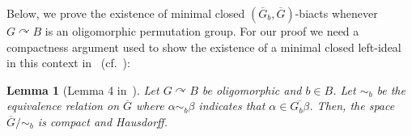 \documentclass{article}
\newtheorem{lemma}[theorem]{Lemma}
\theoremstyle{remark}
\theoremstyle{definition}
\def\acts{\curvearrowright}
\begin{document}
Below, we prove the existence of minimal closed $(\overline{G}_b, \overline{G})$-biacts whenever $G\acts B$ is an oligomorphic permutation group. For our proof we need a {compactness argument} %
 {used} to show the existence of a minimal closed left-ideal in this context in~\cite{barto2017equivalence} (cf.~\cite{Topo-Birk, bodirsky2011n0}): 

\begin{lemma}[{Lemma 4 in~\cite{pinsker2021canonical}}]\label{lem:compactness} Let $G\acts B$ be oligomorphic and $b\in B$. Let $\sim_b$ be the equivalence relation on  $\overline{G}$ where $\alpha\sim_b\beta$ indicates that $\alpha\in\overline{G_b\beta}$. Then, the space $\overline{G}/{\sim_b}$ is compact and Hausdorff.
\end{lemma}

\end{document}
